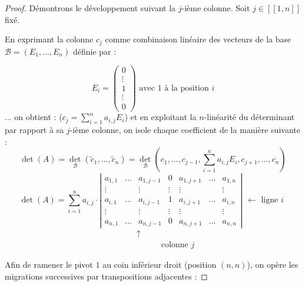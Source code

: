 \documentclass[12pt, a4paper]{report}
\begin{document}
\begin{proof}
    Démontrons le développement suivant la $j$-ième colonne. Soit $j \in [\![1,n]\!]$ fixé.
    
    En exprimant la colonne $c_j$ comme combinaison linéaire des vecteurs de la base $\mathcal B = (E_1,\dots,E_n)$ définie par :

    $$E_i = \left(\begin{matrix} 0 \\ \vdots \\ 1 \\ \vdots \\ 0 \end{matrix}\right) \text{ avec } 1 \text{ à la position } i$$
    ... on obtient : ($c_j = \sum_{i=1}^n a_{i,j} E_i$) et en exploitant la $n$-linéarité du déterminant par rapport à sa $j$-ième colonne, on isole chaque coefficient de la manière suivante :
    $$\det(A) = \det_\mathcal{B}(\tilde c_1, \dots, \tilde c_n) = \det_\mathcal{B}(c_1, \dots, c_{j-1}, \sum_{i=1}^n a_{i,j} E_i, c_{j+1}, \dots, c_n)$$
    $$\det(A) = \sum_{i=1}^n a_{i,j} \cdot \left|\begin{matrix} 
        a_{1,1} & \dots & a_{1,j-1} & 0 & a_{1,j+1} & \dots & a_{1,n} \\
        \vdots & & \vdots & \vdots & \vdots & & \vdots \\
        a_{i,1} & \dots & a_{i,j-1} & 1 & a_{i,j+1} & \dots & a_{i,n} \\
        \vdots & & \vdots & \vdots & \vdots & & \vdots \\
        a_{n,1} & \dots & a_{n,j-1} & 0 & a_{n,j+1} & \dots & a_{n,n}
    \end{matrix}\right| \begin{matrix} \ \\ \ \\ \leftarrow \text{ ligne } i \\ \ \\ \ \end{matrix}$$
    $$\begin{matrix} \qquad \quad \uparrow \\ \qquad \qquad \qquad \text{colonne } j \end{matrix}$$

    Afin de ramener le pivot $1$ au coin inférieur droit (position $(n,n)$), on opère les migrations successives par transpositions adjacentes :


\end{proof}
\end{document}
